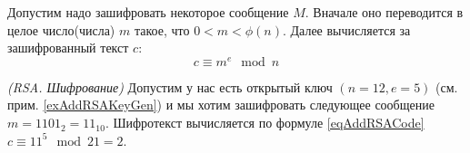 Допустим надо зашифровать некоторое сообщение $M$. Вначале оно
переводится в целое число(числа) $m$ такое, что 
$0 < m < \phi\left(n\right)$. Далее вычисляется за зашифрованный текст
$c$:
\begin{equation}
c \equiv m^e \mod{n}
\label{eqAddRSACode}
\end{equation}

\begin{example}
\emph{(RSA. Шифрование)}
Допустим у нас есть открытый ключ $\left(n=12, e=5\right)$ (см. прим. \ref{exAddRSAKeyGen}) 
и мы хотим зашифровать следующее сообщение $m = 1101_2 = 11_{10}$. 
Шифротекст вычисляется по формуле \eqref{eqAddRSACode} $c \equiv 11^5 \mod{21} = 2$.
\label{exAddRSACode}
\end{example}
